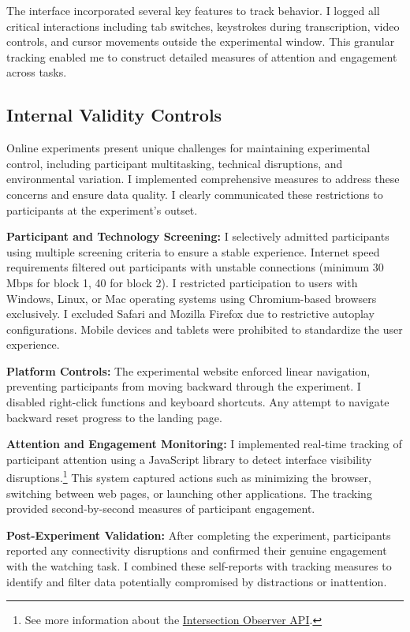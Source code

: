 \documentclass[11pt,a4paper,oneside]{article}
\begin{document}
The interface incorporated several key features to track behavior. I logged all critical interactions including tab switches, keystrokes during transcription, video controls, and cursor movements outside the experimental window. This granular tracking enabled me to construct detailed measures of attention and engagement across tasks.

\subsection{Internal Validity Controls}\label{int-val}
Online experiments present unique challenges for maintaining experimental control, including participant multitasking, technical disruptions, and environmental variation. I implemented comprehensive measures to address these concerns and ensure data quality. I clearly communicated these restrictions to participants at the experiment's outset.

\textbf{Participant and Technology Screening:} I selectively admitted participants using multiple screening criteria to ensure a stable experience. Internet speed requirements filtered out participants with unstable connections (minimum 30 Mbps for block 1, 40 for block 2). I restricted participation to users with Windows, Linux, or Mac operating systems using Chromium-based browsers exclusively. I excluded Safari and Mozilla Firefox due to restrictive autoplay configurations. Mobile devices and tablets were prohibited to standardize the user experience.

\textbf{Platform Controls:} The experimental website enforced linear navigation, preventing participants from moving backward through the experiment. I disabled right-click functions and keyboard shortcuts. Any attempt to navigate backward reset progress to the landing page.

\textbf{Attention and Engagement Monitoring:} I implemented real-time tracking of participant attention using a JavaScript library to detect interface visibility disruptions.\footnote{See more information about the \href{https://developer.mozilla.org/en-US/docs/Web/API/Intersection_Observer_API}{Intersection Observer API}.} This system captured actions such as minimizing the browser, switching between web pages, or launching other applications. The tracking provided second-by-second measures of participant engagement.

\textbf{Post-Experiment Validation:} After completing the experiment, participants reported any connectivity disruptions and confirmed their genuine engagement with the watching task. I combined these self-reports with tracking measures to identify and filter data potentially compromised by distractions or inattention.
\end{document}
